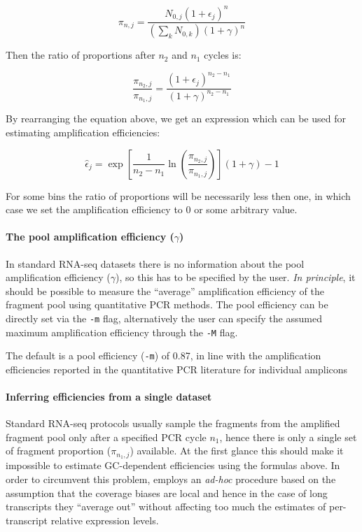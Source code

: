 \begin{equation}
    \pi_{n,j} = \frac{N_{0,j} {(1 + \epsilon_j)}^n}{(\sum_kN_{0,k}) {(1 + \gamma)^n}}
\end{equation}

Then the ratio of proportions after $n_2$ and $n_1$ cycles is:

\begin{equation}
    \frac{\pi_{n_2,j}}{\pi_{n_1,j}} = \frac{{(1+\epsilon_j)}^{n_2 - n_1}}{{(1+\gamma)}^{n_2 - n_1}}
\end{equation}

By rearranging the equation above, we get an expression which can be used for estimating amplification efficiencies:

\begin{equation}\label{eq:eff_est}
    \hat{\epsilon}_j = \exp\left[\frac{1}{n_2 - n_1} \ln\left(\frac{\pi_{n_2,j}}{\pi_{n_1,j}}\right)\right] (1 + \gamma) - 1
\end{equation}

For some bins the ratio of proportions will be necessarily less then one, in which case we set the amplification efficiency to 0 or some arbitrary value.

\paragraph{The pool amplification efficiency ($\gamma$)}

In standard RNA-seq datasets there is no information about the pool amplification efficiency ($\gamma$), so this has to be specified by the user. \emph{In principle}, it should be possible to measure the ``average'' amplification efficiency of the fragment pool using quantitative PCR methods.
The pool efficiency can be directly set via the \texttt{-m} flag, alternatively the user can specify the assumed maximum amplification efficiency through the \texttt{-M} flag.

The default is a pool efficiency (\texttt{-m}) of 0.87, in line with the amplification efficiencies reported in the quantitative PCR literature for individual amplicons \cite{weiss97,karlen07,ruijter09}


\paragraph{Inferring efficiencies from a single dataset}

Standard RNA-seq protocols usually sample the fragments from the amplified fragment pool only after a specified PCR cycle $n_1$, hence there is only a single set of fragment proportion ($\pi_{n_1,j}$) available. At the first glance this should make it impossible to estimate GC-dependent efficiencies using the formulas above. In order to circumvent this problem, \effest employs an \textit{ad-hoc} procedure based on the assumption that the coverage biases are local and hence in the case of long transcripts they ``average out'' without affecting too much the estimates of per-transcript relative expression levels.

